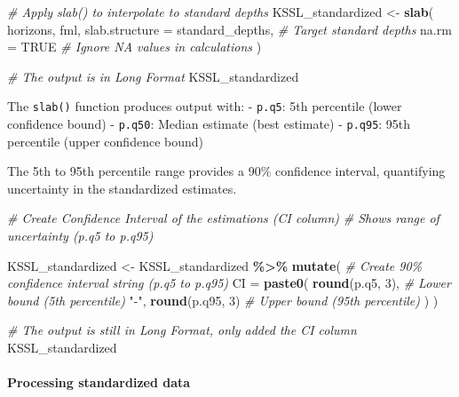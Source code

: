 \documentclass[
  10pt,
  b5paper,
  oneside]{book}
\newenvironment{Shaded}{\begin{snugshade}}{\end{snugshade}}
\newcommand{\AttributeTok}[1]{\textcolor[rgb]{0.13,0.29,0.53}{#1}}
\newcommand{\CommentTok}[1]{\textcolor[rgb]{0.56,0.35,0.01}{\textit{#1}}}
\newcommand{\ConstantTok}[1]{\textcolor[rgb]{0.56,0.35,0.01}{#1}}
\newcommand{\DecValTok}[1]{\textcolor[rgb]{0.00,0.00,0.81}{#1}}
\newcommand{\FunctionTok}[1]{\textcolor[rgb]{0.13,0.29,0.53}{\textbf{#1}}}
\newcommand{\NormalTok}[1]{#1}
\newcommand{\OtherTok}[1]{\textcolor[rgb]{0.56,0.35,0.01}{#1}}
\newcommand{\SpecialCharTok}[1]{\textcolor[rgb]{0.81,0.36,0.00}{\textbf{#1}}}
\newcommand{\StringTok}[1]{\textcolor[rgb]{0.31,0.60,0.02}{#1}}
\begin{document}
\begin{Shaded}
\begin{Highlighting}[]
\CommentTok{\# Apply slab() to interpolate to standard depths}
\NormalTok{KSSL\_standardized }\OtherTok{\textless{}{-}} \FunctionTok{slab}\NormalTok{(}
\NormalTok{  horizons,}
\NormalTok{  fml,}
  \AttributeTok{slab.structure =}\NormalTok{ standard\_depths,  }\CommentTok{\# Target standard depths}
  \AttributeTok{na.rm =} \ConstantTok{TRUE}                        \CommentTok{\# Ignore NA values in calculations}
\NormalTok{)}

\CommentTok{\# The output is in Long Format}
\NormalTok{KSSL\_standardized }
\end{Highlighting}
\end{Shaded}

The \texttt{slab()} function produces output with: - \texttt{p.q5}: 5th percentile (lower confidence bound) - \texttt{p.q50}: Median estimate (best estimate) - \texttt{p.q95}: 95th percentile (upper confidence bound)

The 5th to 95th percentile range provides a 90\% confidence interval, quantifying uncertainty in the standardized estimates.

\begin{Shaded}
\begin{Highlighting}[]
\CommentTok{\# Create Confidence Interval of the estimations (CI column)}
\CommentTok{\# Shows range of uncertainty (p.q5 to p.q95)}

\NormalTok{KSSL\_standardized }\OtherTok{\textless{}{-}}\NormalTok{ KSSL\_standardized }\SpecialCharTok{\%\textgreater{}\%}
  \FunctionTok{mutate}\NormalTok{(}
    \CommentTok{\# Create 90\% confidence interval string (p.q5 to p.q95)}
    \AttributeTok{CI =} \FunctionTok{paste0}\NormalTok{(}
      \FunctionTok{round}\NormalTok{(p.q5, }\DecValTok{3}\NormalTok{),                 }\CommentTok{\# Lower bound (5th percentile)}
      \StringTok{"{-}"}\NormalTok{,}
      \FunctionTok{round}\NormalTok{(p.q95, }\DecValTok{3}\NormalTok{)                 }\CommentTok{\# Upper bound (95th percentile)}
\NormalTok{    )}
\NormalTok{  )}

\CommentTok{\# The output is still in Long Format, only added the CI column}
\NormalTok{KSSL\_standardized}
\end{Highlighting}
\end{Shaded}

\paragraph*{Processing standardized data}\label{processing-standardized-data}
\end{document}

